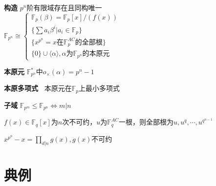 \documentclass[a4paper,10pt]{ctexart}
\newcommand*{\bb}[1]{\mathbb{#1}}
\renewcommand*{\iff}{\Leftrightarrow}
\renewcommand*{\leq}{\leqslant}
\newcommand*{\genfield}[1]{\langle #1 \rangle}
\newcommand*{\ff}[1]{\bb{F}_{#1}}
\begin{document}
\begin{multicols}{3}
    \textbf{构造} $p^n$阶有限域存在且同构唯一\\
    $\ff{p^n} \cong \begin{cases}
            \ff{p}(\beta) = \ff{p}[x]/(f(x))          \\
            \{\sum a_i \beta^i | a_i \in \ff{p}\}     \\
            \{x^{p^n} = x \text{在$\ff{p}^{AC}$的全部根}\} \\
            \{0\} \cup \genfield{\alpha}, \alpha\text{为$\ff{p^n}$的本原元}
        \end{cases}$

    \textbf{本原元} $\ff{p^n}^*$中$o_\times(\alpha) = p^n - 1$

    \textbf{本原多项式\ } 本原元在$\ff{p}$上最小多项式

    \textbf{子域} $\ff{p^m} \leq \ff{p^n} \iff m | n$

    \begin{theorem}[多项式根]
        $f(x) \in \ff{q}[x]$为$n$次不可约，$u$为$\ff{q}^{AC}$一根，则全部根为$u, u^q,\cdots,u^{q^{n-1}}$
    \end{theorem}

    \begin{theorem}[一篮子分解]
        $x^{p^n} \! - \! x \! = \! \prod\limits_{d|n} g(x), g(x)$不可约
    \end{theorem}

    \section{典例}


\end{multicols}
\end{document}
